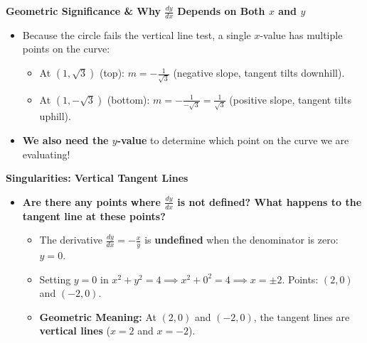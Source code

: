 \documentclass[10.5pt]{article}
\begin{document}
\vspace{0.04in}
\textbf{\large Geometric Significance \& Why $\frac{dy}{dx}$ Depends on Both $x$ and $y$}
\begin{itemize}[leftmargin=1.2em, topsep=0pt, itemsep=1pt]
  \item Because the circle fails the vertical line test, a single $x$-value has multiple points on the curve:
  \begin{itemize}[leftmargin=1.2em, label=--, topsep=0pt, itemsep=1pt]
    \item At $(1, \sqrt{3})$ (top): $m = -\frac{1}{\sqrt{3}}$ (negative slope, tangent tilts downhill).
    \item At $(1, -\sqrt{3})$ (bottom): $m = -\frac{1}{-\sqrt{3}} = \frac{1}{\sqrt{3}}$ (positive slope, tangent tilts uphill).
  \end{itemize}
  \item \textbf{We also need the $y$-value} to determine which point on the curve we are evaluating!
\end{itemize}

\vspace{0.04in}
\textbf{\large Singularities: Vertical Tangent Lines}
\begin{itemize}[leftmargin=1.2em, topsep=0pt, itemsep=1pt]
  \item \textbf{Are there any points where $\frac{dy}{dx}$ is not defined? What happens to the tangent line at these points?}
  \begin{itemize}[leftmargin=1.2em, label=$\bullet$, topsep=0pt, itemsep=1pt]
    \item The derivative $\frac{dy}{dx} = -\frac{x}{y}$ is \textbf{undefined} when the denominator is zero: $y = 0$.
    \item Setting $y = 0$ in $x^2 + y^2 = 4 \implies x^2 + 0^2 = 4 \implies x = \pm 2$. Points: $(2,0)$ and $(-2,0)$.
    \item \textbf{Geometric Meaning:} At $(2,0)$ and $(-2,0)$, the tangent lines are \textbf{vertical lines} ($x = 2$ and $x = -2$).
  \end{itemize}
\end{itemize}
\end{document}
